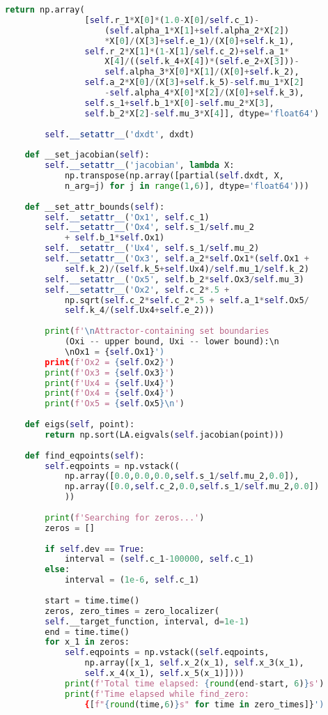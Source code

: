 \begin{lstlisting}[language=Python, showstringspaces=false, caption=Файл \texttt{model.py}.]
			return np.array(
				[self.r_1*X[0]*(1.0-X[0]/self.c_1)-
					(self.alpha_1*X[1]+self.alpha_2*X[2])
					*X[0]/(X[3]+self.e_1)/(X[0]+self.k_1), 
				self.r_2*X[1]*(1-X[1]/self.c_2)+self.a_1*
					X[4]/((self.k_4+X[4])*(self.e_2+X[3]))-
					self.alpha_3*X[0]*X[1]/(X[0]+self.k_2), 
				self.a_2*X[0]/(X[3]+self.k_5)-self.mu_1*X[2]
					-self.alpha_4*X[0]*X[2]/(X[0]+self.k_3), 
				self.s_1+self.b_1*X[0]-self.mu_2*X[3], 
				self.b_2*X[2]-self.mu_3*X[4]], dtype='float64')      
		
		self.__setattr__('dxdt', dxdt)
		
	def __set_jacobian(self):
		self.__setattr__('jacobian', lambda X: 
			np.transpose(np.array([partial(self.dxdt, X, 
			n_arg=j) for j in range(1,6)], dtype='float64')))
		
	def __set_attr_bounds(self):
		self.__setattr__('Ox1', self.c_1)
		self.__setattr__('Ox4', self.s_1/self.mu_2 
			+ self.b_1*self.Ox1)
		self.__setattr__('Ux4', self.s_1/self.mu_2)
		self.__setattr__('Ox3', self.a_2*self.Ox1*(self.Ox1 +
			self.k_2)/(self.k_5+self.Ux4)/self.mu_1/self.k_2)
		self.__setattr__('Ox5', self.b_2*self.Ox3/self.mu_3)
		self.__setattr__('Ox2', self.c_2*.5 + 
			np.sqrt(self.c_2*self.c_2*.5 + self.a_1*self.Ox5/
			self.k_4/(self.Ux4+self.e_2)))
		
		print(f'\nAttractor-containing set boundaries 
			(Oxi -- upper bound, Uxi -- lower bound):\n
			\nOx1 = {self.Ox1}')
		print(f'Ox2 = {self.Ox2}')
		print(f'Ox3 = {self.Ox3}')
		print(f'Ux4 = {self.Ux4}')
		print(f'Ox4 = {self.Ox4}')
		print(f'Ox5 = {self.Ox5}\n')
		
	def eigs(self, point):
		return np.sort(LA.eigvals(self.jacobian(point)))
		
	def find_eqpoints(self):
		self.eqpoints = np.vstack((
			np.array([0.0,0.0,0.0,self.s_1/self.mu_2,0.0]),
			np.array([0.0,self.c_2,0.0,self.s_1/self.mu_2,0.0])
			))
		
		print(f'Searching for zeros...')
		zeros = []
		
		if self.dev == True:
			interval = (self.c_1-100000, self.c_1)
		else:
			interval = (1e-6, self.c_1)
		
		start = time.time()    
		zeros, zero_times = zero_localizer(
		self.__target_function, interval, d=1e-1)
		end = time.time()
		for x_1 in zeros:
			self.eqpoints = np.vstack((self.eqpoints,
				np.array([x_1, self.x_2(x_1), self.x_3(x_1), 
				self.x_4(x_1), self.x_5(x_1)])))
			print(f'Total time elapsed: {round(end-start, 6)}s')
			print(f'Time elapsed while find_zero: 
				{[f"{round(time,6)}s" for time in zero_times]}')
		

\end{lstlisting}
